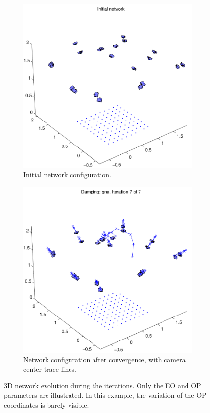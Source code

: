 \documentclass{article}
\begin{document}
\begin{figure}
  \centering
  \begin{subfigure}[b]{0.7\textwidth}
    \includegraphics[width=\textwidth]{ill/ccamx0}
    \caption{Initial network configuration.}
    \label{fig:camx0}
  \end{subfigure}%

  \begin{subfigure}[b]{0.7\textwidth}
    \includegraphics[width=\textwidth]{ill/ccamxfinal}
    \caption{Network configuration after convergence, with camera
      center trace lines.}
    \label{fig:camxfinal}
  \end{subfigure}
  \caption{3D network evolution during the iterations. Only the EO and
    OP parameters are illustrated. In this example, the variation of
    the OP coordinates is barely visible. }\label{fig:net3DTrace}
\end{figure}
\end{document}

